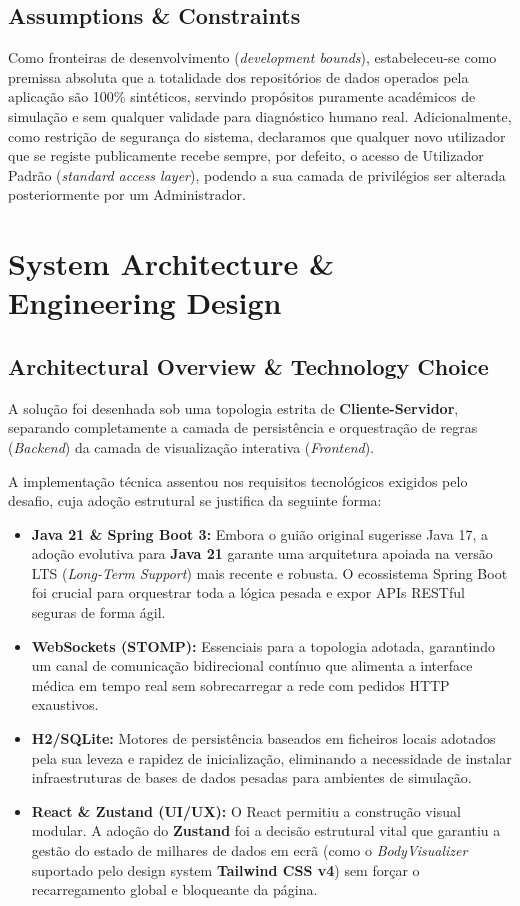 \documentclass[11pt,a4paper]{article}
\begin{document}
\subsection{Assumptions \& Constraints}
Como fronteiras de desenvolvimento (\textit{development bounds}), estabeleceu-se como premissa absoluta que a totalidade dos repositórios de dados operados pela aplicação são 100\% sintéticos, servindo propósitos puramente académicos de simulação e sem qualquer validade para diagnóstico humano real. Adicionalmente, como restrição de segurança do sistema, declaramos que qualquer novo utilizador que se registe publicamente recebe sempre, por defeito, o acesso de Utilizador Padrão (\textit{standard access layer}), podendo a sua camada de privilégios ser alterada posteriormente por um Administrador.

\section{System Architecture \& Engineering Design}

\subsection{Architectural Overview \& Technology Choice}
A solução foi desenhada sob uma topologia estrita de \textbf{Cliente-Servidor}, separando completamente a camada de persistência e orquestração de regras (\textit{Backend}) da camada de visualização interativa (\textit{Frontend}). 

A implementação técnica assentou nos requisitos tecnológicos exigidos pelo desafio, cuja adoção estrutural se justifica da seguinte forma:
\begin{itemize}[label=\color{accentblue}$\bullet$]
    \item \textbf{Java 21 \& Spring Boot 3:} Embora o guião original sugerisse Java 17, a adoção evolutiva para \textbf{Java 21} garante uma arquitetura apoiada na versão LTS (\textit{Long-Term Support}) mais recente e robusta. O ecossistema Spring Boot foi crucial para orquestrar toda a lógica pesada e expor APIs RESTful seguras de forma ágil.
    \item \textbf{WebSockets (STOMP):} Essenciais para a topologia adotada, garantindo um canal de comunicação bidirecional contínuo que alimenta a interface médica em tempo real sem sobrecarregar a rede com pedidos HTTP exaustivos.
    \item \textbf{H2/SQLite:} Motores de persistência baseados em ficheiros locais adotados pela sua leveza e rapidez de inicialização, eliminando a necessidade de instalar infraestruturas de bases de dados pesadas para ambientes de simulação.
    \item \textbf{React \& Zustand (UI/UX):} O React permitiu a construção visual modular. A adoção do \textbf{Zustand} foi a decisão estrutural vital que garantiu a gestão do estado de milhares de dados em ecrã (como o \textit{BodyVisualizer} suportado pelo design system \textbf{Tailwind CSS v4}) sem forçar o recarregamento global e bloqueante da página.
\end{itemize}
\end{document}

